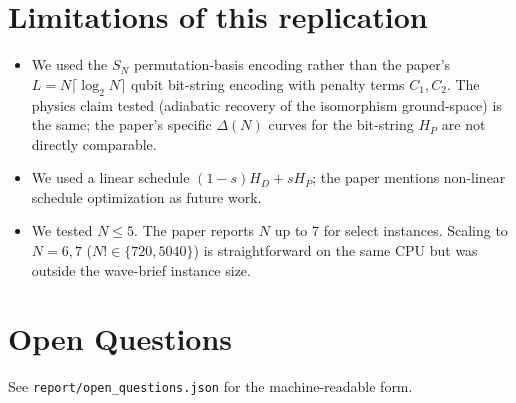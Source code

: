 \documentclass[11pt]{article}
\begin{document}
\section{Limitations of this replication}
\begin{itemize}
  \item We used the $S_N$ permutation-basis encoding rather than the paper's $L=N\lceil\log_2 N\rceil$ qubit bit-string encoding with penalty terms $C_1,C_2$. The physics claim tested (adiabatic recovery of the isomorphism ground-space) is the same; the paper's specific $\Delta(N)$ curves for the bit-string $H_P$ are not directly comparable.
  \item We used a linear schedule $(1-s)H_D+sH_P$; the paper mentions non-linear schedule optimization as future work.
  \item We tested $N\le 5$. The paper reports $N$ up to 7 for select instances. Scaling to $N=6,7$ ($N!\in\{720,5040\}$) is straightforward on the same CPU but was outside the wave-brief instance size.
\end{itemize}

\section{Open Questions}
See \texttt{report/open\_questions.json} for the machine-readable form.
\end{document}
